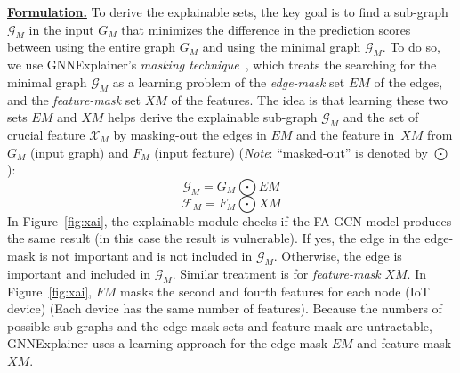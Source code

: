 \noindent \underline{\bf Formulation.}
To derive the explainable sets, the key goal is to find a sub-graph
$\mathcal{G}_M$ in the input $G_M$ that minimizes the
difference in the prediction scores between using the entire graph
$G_M$ and using the minimal graph $\mathcal{G}_M$. To do so, we use
GNNExplainer's {\em masking technique}~\cite{GNNExplainer},
which treats the searching for the minimal graph $\mathcal{G}_M$ as a
learning problem of the {\em edge-mask} set $EM$ of the edges,
and the {\em feature-mask} set $XM$ of the features.
The idea is that learning these two sets $EM$ and $XM$
helps {\tool} derive the explainable sub-graph $\mathcal{G}_M$
and the set of crucial feature $\mathcal{X}_M$
by masking-out the edges in $EM$
and the feature in~$XM$ from $G_M$ (input graph) and $F_M$ (input feature)
({\em Note}: ``masked-out'' is denoted by $\bigodot$):
\begin{equation}\label{eq:11}
\mathcal{G}_M = G_M \bigodot EM
\end{equation}
\begin{equation}
\mathcal{F}_M = F_M \bigodot XM
\end{equation}
In Figure~\ref{fig:xai}, the explainable module checks if the FA-GCN model produces the same result (in this case the result is
vulnerable). If yes, the edge in the edge-mask is not important and
is not included in $\mathcal{G}_M$. Otherwise, the edge is important
and included in $\mathcal{G}_M$.
Similar treatment is for {\em feature-mask} $XM$. In
Figure~\ref{fig:xai}, $FM$ masks the second and fourth features for
each node (IoT device) (Each device has the same number of
features).
Because the numbers of possible sub-graphs and the edge-mask sets
and feature-mask
are untractable, GNNExplainer uses a learning approach for the
edge-mask $EM$ and feature mask $XM$.

